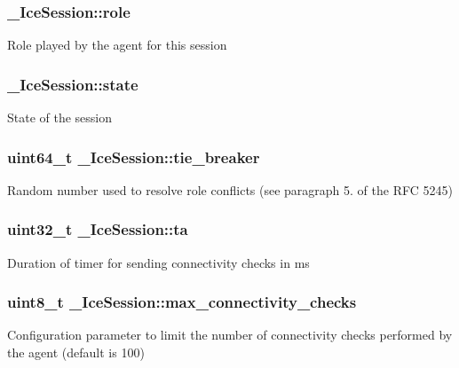 \subsubsection[{role}]{ \-\_\-\-Ice\-Session\-::role}\label{struct__IceSession_ae05f81c7775a437b327aa8b0e6c701bf}
Role played by the agent for this session 
\subsubsection[{state}]{ \-\_\-\-Ice\-Session\-::state}\label{struct__IceSession_a66281b0aa96c3914031a489499ecb5c2}
State of the session 
\subsubsection[{tie\-\_\-breaker}]{\setlength{\rightskip}{0pt plus 5cm}uint64\-\_\-t \-\_\-\-Ice\-Session\-::tie\-\_\-breaker}\label{struct__IceSession_a0a5465370a616123ab40bcb2783791ba}
Random number used to resolve role conflicts (see paragraph 5. of the R\-F\-C 5245) 
\subsubsection[{ta}]{\setlength{\rightskip}{0pt plus 5cm}uint32\-\_\-t \-\_\-\-Ice\-Session\-::ta}\label{struct__IceSession_ad7db59b18b696629923b4007dd7cb8ba}
Duration of timer for sending connectivity checks in ms 
\subsubsection[{max\-\_\-connectivity\-\_\-checks}]{\setlength{\rightskip}{0pt plus 5cm}uint8\-\_\-t \-\_\-\-Ice\-Session\-::max\-\_\-connectivity\-\_\-checks}\label{struct__IceSession_a154d6b0bd4834d047c37d44914b64330}
Configuration parameter to limit the number of connectivity checks performed by the agent (default is 100) 

